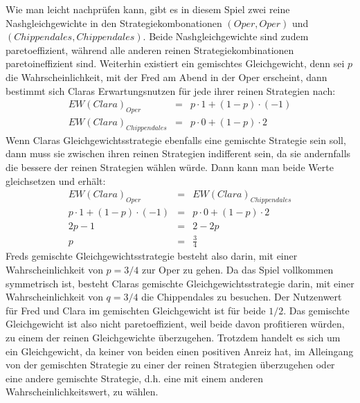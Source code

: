Wie man leicht nachprüfen kann, gibt es in diesem Spiel zwei reine
Nash\-gleich\-ge\-wichte in den Strategiekombonationen $(Oper, Oper)$ und
$(Chippendales, Chippendales)$. Beide Nashgleichgewichte sind zudem
paretoeffizient, während alle anderen reinen Strategiekombinationen
paretoineffizient sind. Weiterhin existiert ein gemischtes Gleichgewicht, denn
sei $p$ die Wahrscheinlichkeit, mit der Fred am Abend in der Oper erscheint,
dann bestimmt sich Claras Erwartungsnutzen für jede ihrer reinen Strategien
nach:
\begin{eqnarray*}
EW(Clara)_{Oper} & = & p \cdot 1 + (1-p) \cdot (-1) \\
EW(Clara)_{Chippendales} & = & p \cdot 0 + (1-p) \cdot 2 
\end{eqnarray*}
Wenn Claras Gleichgewichtsstrategie ebenfalls eine gemischte Strategie sein
soll, dann muss sie zwischen ihren reinen Strategien indifferent sein, da sie
andernfalls die bessere der reinen Strategien wählen würde. Dann kann man beide
Werte  gleichsetzen und erhält:
\begin{eqnarray*}
EW(Clara)_{Oper} & = & EW(Clara)_{Chippendales} \\
p \cdot 1 + (1-p) \cdot (-1) & = & p \cdot 0 + (1-p) \cdot 2 \\
2p - 1 & = & 2 - 2p \\
p & = & \frac{3}{4}
\end{eqnarray*}
Freds gemischte Gleichgewichtsstrategie besteht also darin, mit einer
Wahrscheinlichkeit von $p=3/4$ zur Oper zu gehen. Da das Spiel vollkommen
symmetrisch ist, besteht Claras gemischte Gleichgewichtsstrategie darin, mit
einer Wahrscheinlichkeit von $q=3/4$ die Chippendales zu besuchen. Der
Nutzenwert für Fred und Clara im gemischten Gleichgewicht ist für beide $1/2$.
Das gemischte Gleichgewicht ist also nicht paretoeffizient, weil beide davon
profitieren würden, zu einem der reinen Gleichgewichte überzugehen. Trotzdem
handelt es sich um ein Gleichgewicht, da keiner von beiden einen positiven
Anreiz hat, im Alleingang von der gemischten Strategie zu einer der reinen
Strategien überzugehen oder eine andere gemischte Strategie, d.h. eine mit
einem anderen Wahrscheinlichkeitswert, zu wählen.

